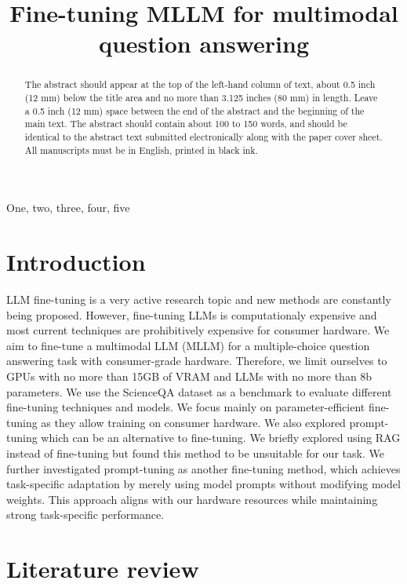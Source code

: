 \documentclass{article}
\title{Fine-tuning MLLM for multimodal question answering}
\begin{document}
%
\maketitle
%
\begin{abstract}
The abstract should appear at the top of the left-hand column of text, about
0.5 inch (12 mm) below the title area and no more than 3.125 inches (80 mm) in
length.  Leave a 0.5 inch (12 mm) space between the end of the abstract and the
beginning of the main text.  The abstract should contain about 100 to 150
words, and should be identical to the abstract text submitted electronically
along with the paper cover sheet.  All manuscripts must be in English, printed
in black ink.
\end{abstract}
%
\begin{keywords}
One, two, three, four, five
\end{keywords}
%
\section{Introduction}
\label{sec:intro}
LLM fine-tuning is a very active research topic and new methods are constantly being proposed. However, fine-tuning LLMs is computationaly expensive and most current techniques are prohibitively expensive for consumer hardware. We aim to fine-tune a multimodal LLM (MLLM) for a multiple-choice question answering task with consumer-grade hardware. Therefore, we limit ourselves to GPUs with no more than 15GB of VRAM and LLMs with no more than 8b parameters. We use the ScienceQA dataset as a benchmark to evaluate different fine-tuning techniques and models. We focus mainly on parameter-efficient fine-tuning as they allow training on consumer hardware. We also explored prompt-tuning which can be an alternative to fine-tuning. We briefly explored using RAG instead of fine-tuning but found this method to be unsuitable for our task. We further investigated prompt-tuning as another fine-tuning method, which achieves task-specific adaptation by merely using model prompts without modifying model weights. This approach aligns with our hardware resources while maintaining strong task-specific performance.

\section{Literature review}
\label{sec:litreview}
\end{document}
